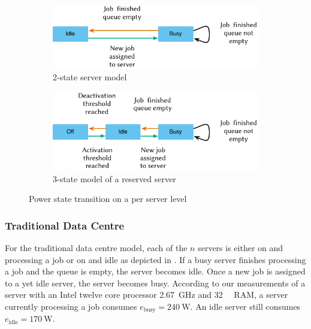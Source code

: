\begin{figure}
	\begin{subfigure}[b]{\textwidth}
	\centering
	\includegraphics{cloud/data_centers/problem_formulation/figures/idle_busy}
	\caption{2-state server model}\label{fig:cloud:data_centers:problem_formulation:servers:idle_busy}
	\end{subfigure} 
	\begin{subfigure}[b]{\textwidth}
	\centering
	\includegraphics{cloud/data_centers/problem_formulation/figures/idle_busy_off}
	\caption{3-state model of a reserved server}\label{fig:cloud:data_centers:problem_formulation:idle_busy_off}
	\end{subfigure}

	\caption{Power state transition on a per server level}\label{fig:cloud:data_centers:problem_formulation:servers}
\end{figure}

\subsubsection*{Traditional Data Centre}\label{sec:cloud:data_centers:problem_formulation:default_data_center}
For the traditional data centre model, each of the \(n\) servers is either on and processing a job or on and idle as depicted in .
If a busy server finishes processing a job and the queue is empty, the server becomes idle. Once a new job is assigned to a yet idle server, the server becomes busy.
According to our measurements of a server with an Intel twelve core processor \SI{2.67}{\giga\hertz} and \SI{32}{\giga\byte} RAM, a server currently processing a job consumes \(e_{\text{busy}} = \SI{240}{\watt}\).
An idle server still consumes \(e_{\text{idle}} = \SI{170}{\watt}\).

